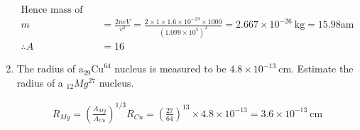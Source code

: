 \begin{enumerate}
\begin{answer}
\begin{align*}
		\text{Hence mass of ion}\\
		m&=\frac{2 n e V}{v^2}=\frac{2 \times 1 \times 1.6 \times 10^{-19} \times 1000}{\left(1.099 \times 10^5\right)^2}=2.667 \times 10^{-26} \mathrm{~kg}=15.98 \mathrm{am} \\
		\therefore A&=16
		\end{align*}
	\end{answer}
	\item  The radius of $\mathrm{a}_{29} \mathrm{Cu}^{64}$ nucleus is measured to be $4.8 \times 10^{-13} \mathrm{~cm}$. Estimate the radius of a ${ }_{12} M g^{27}$ nucleus.
	\begin{answer}
		\begin{align*}
		R_{M g}=\left(\frac{A_{M g}}{A_{C u}}\right)^{1 / 3} R_{C u}=\left(\frac{27}{64}\right)^{13} \times 4.8 \times 10^{-13}=3.6 \times 10^{-13} \mathrm{~cm}
		\end{align*}
	\end{answer}
\end{enumerate}








